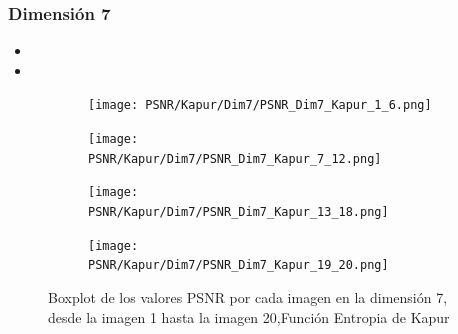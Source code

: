 \documentclass[conference]{IEEEtran}
\begin{document}
\subsubsection{Dimensión 7}
\begin{itemize}
	\item 
	\item 
	
\end{itemize}
\begin{figure}[htbp]
	\centering
	\begin{subfigure}{0.4\textwidth}
		\texttt{[image: PSNR/Kapur/Dim7/PSNR\_Dim7\_Kapur\_1\_6.png]}
	\end{subfigure}
	
	\begin{subfigure}{0.4\textwidth}
		\texttt{[image: PSNR/Kapur/Dim7/PSNR\_Dim7\_Kapur\_7\_12.png]}
	\end{subfigure}
	\begin{subfigure}{0.4\textwidth}
		\texttt{[image: PSNR/Kapur/Dim7/PSNR\_Dim7\_Kapur\_13\_18.png]}
	\end{subfigure}  
	\begin{subfigure}{0.4\textwidth}
		\texttt{[image: PSNR/Kapur/Dim7/PSNR\_Dim7\_Kapur\_19\_20.png]}
		\vspace{-120pt} %
	\end{subfigure}
	\caption{Boxplot de los valores PSNR por cada imagen en la dimensión 7, desde la imagen 1 hasta la imagen 20,Función Entropia de Kapur}
	\label{fig:imagenes}    
\end{figure}
\end{document}
